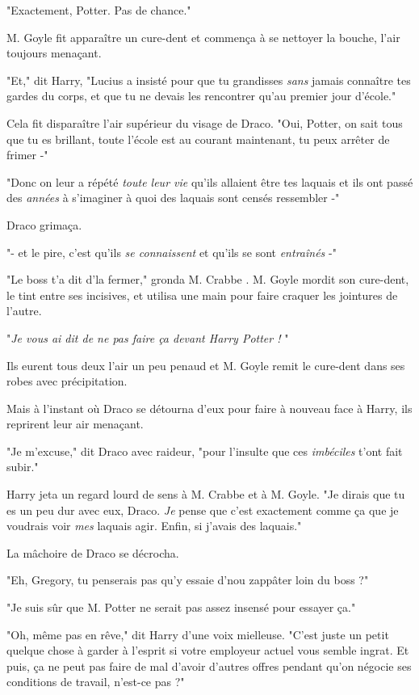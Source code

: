 "Exactement, Potter. Pas de chance."

M. Goyle fit apparaître un cure-dent et commença à se nettoyer la bouche, l'air toujours menaçant.

"Et," dit Harry, "Lucius a insisté pour que tu grandisses \emph{sans}  jamais connaître tes gardes du corps, et que tu ne devais les rencontrer qu'au premier jour d'école."

Cela fit disparaître l'air supérieur du visage de Draco. "Oui, Potter, on sait tous que tu es brillant, toute l'école est au courant maintenant, tu peux arrêter de frimer -"

"Donc on leur a répété \emph{toute leur vie}  qu'ils allaient être tes laquais et ils ont passé des \emph{années}  à s'imaginer à quoi des laquais sont censés ressembler -"

Draco grimaça.

"- et le pire, c'est qu'ils \emph{se connaissent}  et qu'ils se sont \emph{entraînés}  -"

"Le boss t'a dit d'la fermer," gronda M. Crabbe . M. Goyle mordit son cure-dent, le tint entre ses incisives, et utilisa une main pour faire craquer les jointures de l'autre.

"\emph{Je vous ai dit de ne pas faire ça devant Harry Potter !} "

Ils eurent tous deux l'air un peu penaud et M. Goyle remit le cure-dent dans ses robes avec précipitation.

Mais à l'instant où Draco se détourna d'eux pour faire à nouveau face à Harry, ils reprirent leur air menaçant.

"Je m'excuse," dit Draco avec raideur, "pour l'insulte que ces \emph{imbéciles}  t'ont fait subir."

Harry jeta un regard lourd de sens à M. Crabbe et à M. Goyle. "Je dirais que tu es un peu dur avec eux, Draco. \emph{Je}  pense que c'est exactement comme ça que je voudrais voir \emph{mes}  laquais agir. Enfin, si j'avais des laquais."

La mâchoire de Draco se décrocha.

"Eh, Gregory, tu penserais pas qu'y essaie d'nou zappâter loin du boss ?"

"Je suis sûr que M. Potter ne serait pas assez insensé pour essayer ça."

"Oh, même pas en rêve," dit Harry d'une voix mielleuse. "C'est juste un petit quelque chose à garder à l'esprit si votre employeur actuel vous semble ingrat. Et puis, ça ne peut pas faire de mal d'avoir d'autres offres pendant qu'on négocie ses conditions de travail, n'est-ce pas ?"

